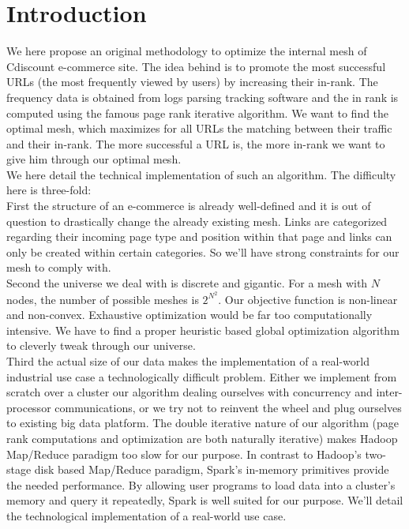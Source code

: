 \documentclass{iSWAGArticle}
\begin{document}
\section{Introduction}
We here propose an original methodology to optimize the internal mesh of Cdiscount e-commerce site.
The idea behind is to promote the most successful URLs (the most frequently viewed by users) by increasing their in-rank.  
The frequency data is obtained from logs parsing tracking software and the in rank is computed using the famous page rank iterative algorithm.  
We want to find the optimal mesh, which maximizes for all URLs the matching between their traffic and their in-rank. 
The more successful a URL is, the more in-rank we want to give him through our optimal mesh.
 \\\newline
We here detail the technical implementation of such an algorithm.
The difficulty here is three-fold:
\\
\indent
First the structure of an e-commerce is already well-defined and it is out of question to drastically change the already existing mesh.
Links are categorized regarding their incoming page type and position within that page and links can only be created within certain categories. 
So we'll have strong constraints for our mesh to comply with.
\\
\indent
Second the universe we deal with is discrete and gigantic. 
For a mesh with $N$ nodes, the number of possible meshes is $2^{N^{2}}$. 
Our objective function is non-linear and non-convex. Exhaustive optimization would be far too computationally intensive. 
We have to find a proper heuristic based global optimization algorithm to cleverly tweak through our universe.
\\
\indent
Third the actual size of our data makes the implementation of a real-world industrial use case a technologically difficult problem.
Either we implement from scratch over a cluster our algorithm dealing ourselves with concurrency and inter-processor communications,
or we try not to reinvent the wheel and plug ourselves to existing big data platform.
The double iterative nature of our algorithm (page rank computations and optimization are both naturally iterative)
makes Hadoop Map/Reduce paradigm too slow for our purpose. 
In contrast to Hadoop's two-stage disk based Map/Reduce paradigm, Spark's in-memory primitives provide the needed performance.
By allowing user programs to load data into a cluster's memory and query it repeatedly, Spark is well suited for our purpose.
We'll detail the technological implementation of a real-world use case.
\end{document}
